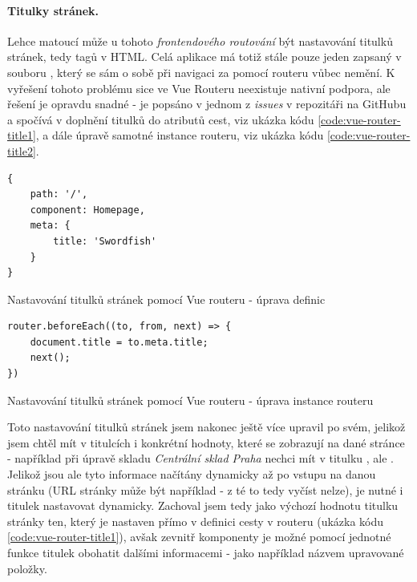 \paragraph{Titulky stránek.} Lehce matoucí může u tohoto \emph{frontendového routování} být nastavování titulků stránek, tedy  tagů v HTML. Celá aplikace má totiž stále pouze jeden  zapsaný v souboru , který se sám o sobě při navigaci za pomocí routeru vůbec nemění. K vyřešení tohoto problému sice ve Vue Routeru neexistuje nativní podpora, ale řešení je opravdu snadné - je popsáno v jednom z \emph{issues} v repozitáři na GitHubu \cite{vue-router-title} a spočívá v doplnění titulků do  atributů cest, viz ukázka kódu \ref{code:vue-router-title1}, a dále úpravě samotné instance routeru, viz ukázka kódu \ref{code:vue-router-title2}.

\begin{listing}[]
\begin{verbatim}
{
    path: '/',
    component: Homepage,
    meta: {
        title: 'Swordfish'
    }
}
\end{verbatim}
\caption{Nastavování titulků stránek pomocí Vue routeru - úprava definic} \label{code:vue-router-title1}
\end{listing}

\begin{listing}[]
    \begin{verbatim}
router.beforeEach((to, from, next) => {
    document.title = to.meta.title;
    next();
})
\end{verbatim}
\caption{Nastavování titulků stránek pomocí Vue routeru - úprava instance routeru} \label{code:vue-router-title2}
\end{listing}

Toto nastavování titulků stránek jsem nakonec ještě více upravil po svém, jelikož jsem chtěl mít v titulcích i konkrétní hodnoty, které se zobrazují na dané stránce - například při úpravě skladu \emph{Centrální sklad Praha} nechci mít v titulku , ale . Jelikož jsou ale tyto informace načítány dynamicky až po vstupu na danou stránku (URL stránky může být například  - z té to tedy vyčíst nelze), je nutné i titulek nastavovat dynamicky. Zachoval jsem tedy jako výchozí hodnotu titulku stránky ten, který je nastaven přímo v definici cesty v routeru (ukázka kódu \ref{code:vue-router-title1}), avšak zevnitř komponenty je možné pomocí jednotné funkce titulek obohatit dalšími informacemi - jako například názvem upravované položky.

